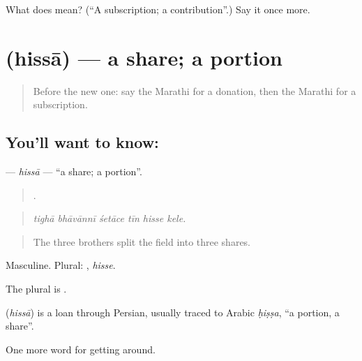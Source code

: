 \begin{tcolorbox}[breakable,colback=teal!4,colframe=teal!35!black,title={Before you move on}]
What does  mean? (\textquotedblleft{}A subscription; a contribution\textquotedblright{}.) Say it once more.
\end{tcolorbox}
\section[\texorpdfstring{\mr{हिस्सा} (hissā)}{हिस्सा (hissā)}]{ (hissā) — a share; a portion}

\label{lesson:MR-C430-hissa}



\begin{quote}
Before the new one: say the Marathi for a donation, then the Marathi for a subscription.
\end{quote}

\subsection*{You'll want to know: }
\textbf{} — \emph{hissā} — \textquotedblleft{}a share; a portion\textquotedblright{}.

\begin{quote}
     .
\end{quote}

\begin{quote}
\emph{tighā bhāvānnī śetāce tīn hisse kele.}
\end{quote}

\begin{quote}
The three brothers split the field into three shares.
\end{quote}

Masculine. Plural: , \emph{hisse}.

The plural is .

\begin{cousinweb}
\textbf{} (\emph{hissā}) is a loan through Persian, usually traced to Arabic \emph{ḥiṣṣa}, \textquotedblleft{}a portion, a share\textquotedblright{}.
\end{cousinweb}

\begin{grammarlens}[title={What you've built}]
One more word for getting around.
\end{grammarlens}

